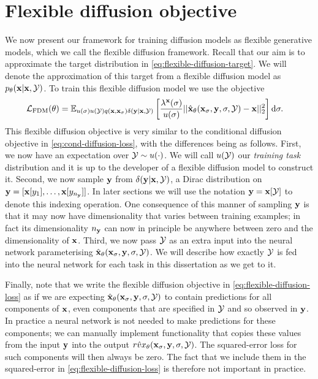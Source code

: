 \section{Flexible diffusion objective}

We now present our framework for training diffusion models as flexible generative models, which we call the flexible diffusion framework. Recall that our aim is to approximate the target distribution in \cref{eq:flexible-diffusion-target}. We will denote the approximation of this target from a flexible diffusion model as $p_\theta({\mathbf{x}}|{\mathbf{x}},{\mathcal{Y}})$. To train this flexible diffusion model we use the objective
\begin{align} \label{eq:flexible-diffusion-loss}
    \mathcal{L}_\text{FDM}(\theta) &= \mathbb{E}_{u(\sigma)u({\mathcal{Y}})q({\mathbf{x}}, {\mathbf{x}}_\sigma)\delta({\mathbf{y}}|{\mathbf{x}},{\mathcal{Y}})} \left[ 
    \frac{\lambda^{\mathbf{x}}(\sigma)}{u(\sigma)} || \hat{{\mathbf{x}}}_\theta({\mathbf{x}}_\sigma, {\mathbf{y}}, \sigma, {\mathcal{Y}}) - {\mathbf{x}} ||_2^2 \right] \mathrm{d}\sigma.
\end{align}
This flexible diffusion objective is very similar to the conditional diffusion objective in \cref{eq:cond-diffusion-loss}, with the differences being as follows. First, we now have an expectation over ${\mathcal{Y}} \sim u(\cdot)$. We will call $u({\mathcal{Y}})$ our \textit{training task} distribution and it is up to the developer of a flexible diffusion model to construct it. Second, we now sample ${\mathbf{y}}$ from $\delta({\mathbf{y}}|{\mathbf{x}},{\mathcal{Y}})$, a Dirac distribution on ${\mathbf{y}} = [ {\mathbf{x}}[y_1], \ldots, {\mathbf{x}}[y_{n_{\mathbf{y}}}] ]$. In later sections we will use the notation ${\mathbf{y}} = {\mathbf{x}}[{\mathcal{Y}}]$ to denote this indexing operation. One consequence of this manner of sampling ${\mathbf{y}}$ is that it may now have dimensionality that varies between training examples; in fact its dimensionality $n_{\mathbf{y}}$ can now in principle be anywhere between zero and the dimensionality of ${\mathbf{x}}$. Third, we now pass ${\mathcal{Y}}$ as an extra input into the neural network parameterising $\hat{{\mathbf{x}}}_\theta({\mathbf{x}}_\sigma, {\mathbf{y}}, \sigma, {\mathcal{Y}})$. We will describe how exactly ${\mathcal{Y}}$ is fed into the neural network for each task in this dissertation as we get to it.

Finally, note that we write the flexible diffusion objective in  \cref{eq:flexible-diffusion-loss} as if we are expecting $\hat{{\mathbf{x}}}_\theta({\mathbf{x}}_\sigma, {\mathbf{y}}, \sigma, {\mathcal{Y}})$ to contain predictions for all components of ${\mathbf{x}}$, even components that are specified in ${\mathcal{Y}}$ and so observed in ${\mathbf{y}}$. In practice a neural network is not needed to make predictions for these components; we can manually implement functionality that copies these values from the input ${\mathbf{y}}$ into the output $\hat{rvx}_\theta({\mathbf{x}}_\sigma, {\mathbf{y}}, \sigma, {\mathcal{Y}})$. The squared-error loss for such components will then always be zero. The fact that we include them in the squared-error in \cref{eq:flexible-diffusion-loss} is therefore not important in practice.


